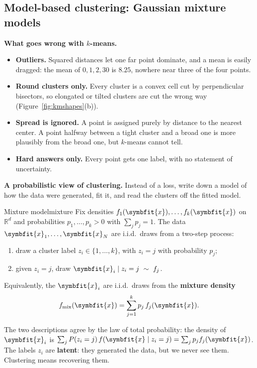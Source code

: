 \documentclass[11pt]{article}
\newcommand{\bm}[1]{\symbfit{#1}}
\newcommand{\R}{\mathbb{R}}
\newcommand{\vx}{\bm{x}}
\begin{document}
\subsection{Model-based clustering: Gaussian mixture models}

\textbf{What goes wrong with $k$-means.}
\begin{itemize}[nosep]
\item \textbf{Outliers.} Squared distances let one far point dominate, and a mean is easily dragged: the mean of $0,1,2,30$ is $8.25$, nowhere near three of the four points.
\item \textbf{Round clusters only.} Every cluster is a convex cell cut by perpendicular bisectors, so elongated or tilted clusters are cut the wrong way (Figure~\ref{fig:kmshapes}(b)).
\item \textbf{Spread is ignored.} A point is assigned purely by distance to the nearest center. A point halfway between a tight cluster and a broad one is more plausibly from the broad one, but $k$-means cannot tell.
\item \textbf{Hard answers only.} Every point gets one label, with no statement of uncertainty.
\end{itemize}

\textbf{A probabilistic view of clustering.} Instead of a loss, write down a model of how the data were generated, fit it, and read the clusters off the fitted model.

\begin{definition}{Mixture model}{mixture}
Fix densities $f_1(\vx),\dots,f_k(\vx)$ on $\R^d$ and probabilities $p_1,\dots,p_k>0$ with $\sum_jp_j=1$. The data $\vx_1,\dots,\vx_N$ are i.i.d.\ draws from a two-step process:
\begin{enumerate}[nosep,label=(\roman*)]
\item draw a cluster label $z_i\in\{1,\dots,k\}$, with $z_i=j$ with probability $p_j$;
\item given $z_i=j$, draw $\vx_i\mid z_i=j\ \sim\ f_j$.
\end{enumerate}
Equivalently, the $\vx_i$ are i.i.d.\ draws from the \textbf{mixture density}
\[
f_{\mathrm{mix}}(\vx)=\sum_{j=1}^kp_j\,f_j(\vx).
\]
\end{definition}
The two descriptions agree by the law of total probability: the density of $\vx_i$ is $\sum_jP(z_i=j)\,f(\vx\mid z_i=j)=\sum_jp_jf_j(\vx)$. The labels $z_i$ are \textbf{latent}: they generated the data, but we never see them. Clustering means recovering them.
\end{document}
